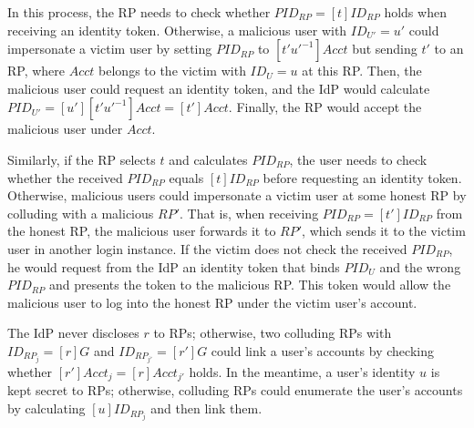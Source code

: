 \newc
In this process, the RP needs to check whether $PID_{RP} = [t]ID_{RP}$ holds when receiving an identity token.
Otherwise, a malicious user with $ID_{U'} = u'$ could impersonate a victim user by setting $PID_{RP}$ to $[t'u'^{-1}]Acct$ but sending $t'$ to an RP, where $Acct$ belongs to the victim with $ID_{U} = u$ at this RP.
Then, the malicious user could request an identity token,
 and the IdP would calculate $PID_{U'} = [u'][t'u'^{-1}]Acct = [t']Acct$.
Finally, the RP would accept the malicious user under $Acct$. %

Similarly, if the RP selects $t$ and calculates $PID_{RP}$,
 the user needs to check whether the received $PID_{RP}$ equals $[t]ID_{RP}$ before requesting an identity token.
Otherwise, malicious users could impersonate a victim user at some honest RP by colluding with a malicious $RP'$.
That is, when receiving $PID_{RP}=[t']ID_{RP}$ from the honest RP, the malicious user forwards it to $RP'$, which sends it to the victim user in another login instance.
If the victim does not check the received $PID_{RP}$, he would request from the IdP an identity token that binds $PID_U$ and the wrong $PID_{RP}$ and presents the token to the malicious RP.
This token would allow the malicious user to log into the honest RP under the victim user's account.

\oldc
The IdP never discloses $r$ to RPs; otherwise, two colluding RPs with $ID_{RP_j} = [r]G$ and $ID_{RP_{j'}} = [r']G$ could link a user's accounts by checking whether $[r']Acct_j = [r]Acct_{j'}$ holds.
In the meantime, a user's identity $u$ is kept secret to RPs; otherwise, colluding RPs could enumerate the user's accounts by calculating $[u]ID_{RP_j}$ and then link them.




